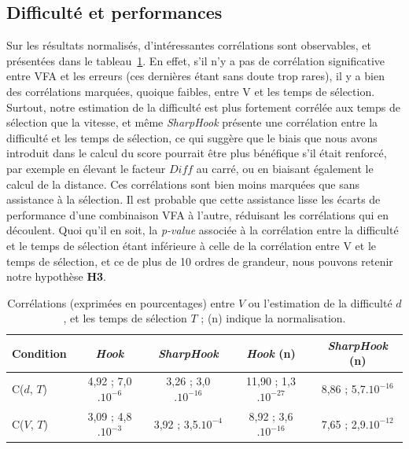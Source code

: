 	\subsection{Difficulté et performances}
	Sur les résultats normalisés, d'intéressantes corrélations sont observables, et présentées dans le tableau~\ref{tab:hookCorr}. En effet, s'il n'y a pas de corrélation significative entre VFA et les erreurs (ces dernières étant sans doute trop rares), il y a bien des corrélations marquées, quoique faibles, entre V et les temps de sélection. Surtout, notre estimation de la difficulté est plus fortement corrélée aux temps de sélection que la vitesse, et même \emph{SharpHook} présente une corrélation entre la difficulté et les temps de sélection, ce qui suggère que le biais que nous avons introduit dans le calcul du score pourrait être plus bénéfique s'il était renforcé, par exemple en élevant le facteur $Diff$ au carré, ou en biaisant également le calcul de la distance. Ces corrélations sont bien moins marquées que sans assistance à la sélection. Il est probable que cette assistance lisse les écarts de performance d'une combinaison VFA à l'autre, réduisant les corrélations qui en découlent. Quoi qu'il en soit, la \emph{p-value} associée à la corrélation entre la difficulté et le temps de sélection étant inférieure à celle de la corrélation entre V et le temps de sélection, et ce de plus de 10 ordres de grandeur, nous pouvons retenir notre hypothèse \textbf{H3}.

	
	\begin{table}
		\centering
		\begin{tabular}{l | c c c c}
			Condition			& \emph{Hook}				& \emph{SharpHook}			& \emph{Hook} (n)			& \emph{SharpHook} (n)	\bigstrut[b] \\ \hline
			C($d$, $T$)			& 4,92 ; 7,0$.10^{-6}$		& 3,26 ; 3,0$.10^{-16}$		& 11,90 ; 1,3$.10^{-27}$	& 8,86 ; 5,7$.10^{-16}$	\bigstrut[t] \\
			C($V$, $T$)			& 3,09 ; 4,8$.10^{-3}$		& 3,92 ; 3,5$.10^{-4}$		& 8,92 ; 3,6$.10^{-16}$		& 7,65 ; 2,9$.10^{-12}$	\\
		\end{tabular}
		\caption[\emph{Hook} et \emph{SharpHook} -- corrélations]{Corrélations (exprimées en pourcentages) entre $V$ ou l'estimation de la difficulté $d$, et les temps de sélection $T$ ; \og (n) \fg{} indique la normalisation.}
		\label{tab:hookCorr}
	\end{table}	
	
